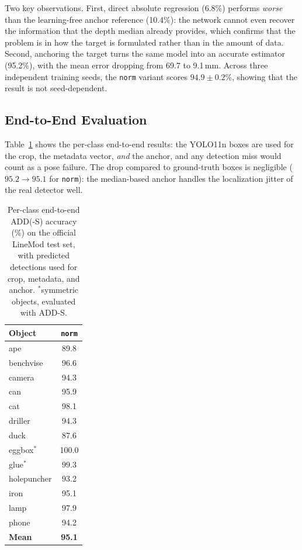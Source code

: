 Two key observations. First, direct absolute regression (6.8\%) performs \emph{worse} than the learning-free anchor reference (10.4\%): the network cannot even recover the information that the depth median already provides, which confirms that the problem is in how the target is formulated rather than in the amount of data. Second, anchoring the target turns the same model into an accurate estimator (95.2\%), with the mean error dropping from 69.7 to 9.1\,mm. Across three independent training seeds, the \texttt{norm} variant scores $94.9 \pm 0.2$\%, showing that the result is not seed-dependent.

\subsection{End-to-End Evaluation}
\label{sec:exp_results}

Table~\ref{tab:perclass} shows the per-class end-to-end results: the YOLO11n boxes are used for the crop, the metadata vector, \emph{and} the anchor, and any detection miss would count as a pose failure. The drop compared to ground-truth boxes is negligible ($95.2 \rightarrow 95.1$ for \texttt{norm}): the median-based anchor handles the localization jitter of the real detector well.

\begin{table}[t]
    \centering
    \caption{Per-class end-to-end ADD(-S) accuracy (\%) on the official LineMod test set, with predicted detections used for crop, metadata, and anchor. $^*$symmetric objects, evaluated with ADD-S.}
    \label{tab:perclass}
    \small
    \begin{tabular}{@{}lc@{}}
        \toprule
        \textbf{Object} & \texttt{norm} \\
        \midrule
        ape          & 89.8 \\
        benchvise    & 96.6 \\
        camera       & 94.3 \\
        can          & 95.9 \\
        cat          & 98.1 \\
        driller      & 94.3 \\
        duck         & 87.6 \\
        eggbox$^*$   & 100.0 \\
        glue$^*$     & 99.3 \\
        holepuncher  & 93.2 \\
        iron         & 95.1 \\
        lamp         & 97.9 \\
        phone        & 94.2 \\
        \midrule
        \textbf{Mean} & \textbf{95.1} \\
        \bottomrule
    \end{tabular}
\end{table}

